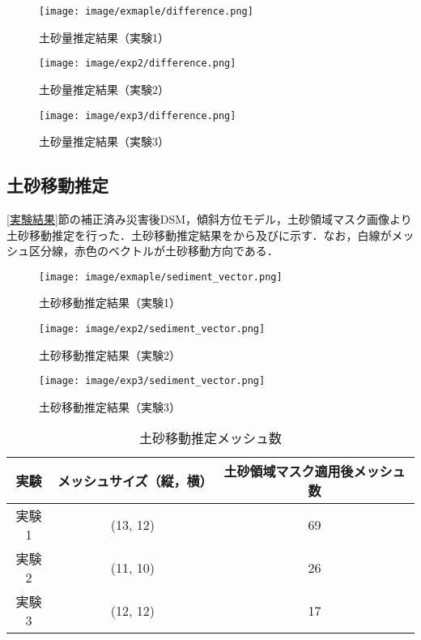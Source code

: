       \begin{figure}[tbp]
        \centering
        \texttt{[image: image/exmaple/difference.png]}
        \caption{土砂量推定結果（実験1）}
        \label{土砂量推定結果（実験1）}
      \end{figure}

      \begin{figure}[tbp]
        \centering
        \texttt{[image: image/exp2/difference.png]}
        \caption{土砂量推定結果（実験2）}
      \end{figure}

      \begin{figure}[tbp]
        \centering
        \texttt{[image: image/exp3/difference.png]}
        \caption{土砂量推定結果（実験3）}
        \label{土砂量推定結果（実験3）}
      \end{figure}


    \subsection*{土砂移動推定}
      \ref{実験結果}節の補正済み災害後DSM，傾斜方位モデル，土砂領域マスク画像より土砂移動推定を行った．土砂移動推定結果をから及びに示す．なお，白線がメッシュ区分線，赤色のベクトルが土砂移動方向である．

      \begin{figure}[tbp]
        \centering
        \texttt{[image: image/exmaple/sediment\_vector.png]}
        \caption{土砂移動推定結果（実験1）}
        \label{土砂移動推定結果（実験1）}
      \end{figure}

      \begin{figure}[tbp]
        \centering
        \texttt{[image: image/exp2/sediment\_vector.png]}
        \caption{土砂移動推定結果（実験2）}
      \end{figure}

      \begin{figure}[tbp]
        \centering
        \texttt{[image: image/exp3/sediment\_vector.png]}
        \caption{土砂移動推定結果（実験3）}
        \label{土砂移動推定結果（実験3）}
      \end{figure}

      \begin{table}[tbp]
        \centering
        \caption{土砂移動推定メッシュ数}
        \label{土砂移動推定メッシュ数}
        \begin{tabular}{ccc}
          \hline
          \textbf{実験} & \textbf{メッシュサイズ（縦，横）} & \textbf{土砂領域マスク適用後メッシュ数} \\
          \hline  \hline
          実験1 & (13, 12) & 69 \\
          実験2 & (11, 10) & 26 \\
          実験3 & (12, 12) & 17 \\ \hline
        \end{tabular}
      \end{table}
 


